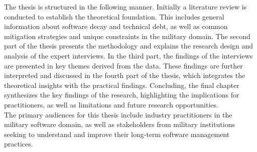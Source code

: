 The thesis is structured in the following manner. Initially a literature review is conducted to establish the theoretical foundation. This includes general information about software decay and technical debt,
as well as common mitigation strategies and unique constraints in the military domain. The second part of the thesis presents the methodology and explains the research design and analysis of the expert interviews.
In the third part, the findings of the interviews are presented in key themes derived from the data. These findings are further interpreted and discussed in the fourth part of the thesis, which integrates the theoretical insights with the practical findings.
Concluding, the final chapter synthesizes the key findings of the research, highlighting the implications for practitioners, as well as limitations and future research opportunities.\\
The primary audiences for this thesis include industry practitioners in the military software domain, as well as stakeholders from military institutions seeking to understand and improve their long-term software management practices.